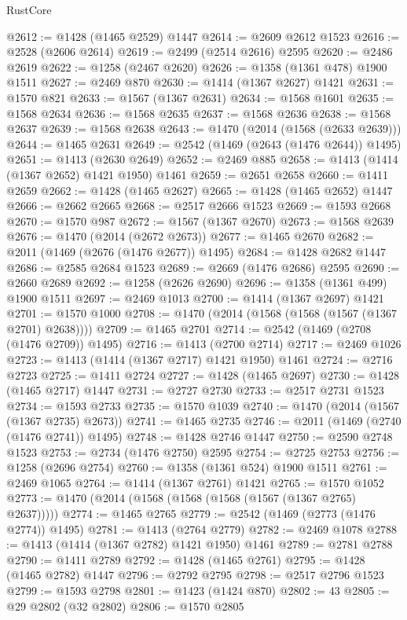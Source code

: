 \begin{lexlean}{RustCore}
\begin{coremodule}
@2612 := @1428 (@1465 @2529) @1447
@2614 := @2609 @2612 @1523
@2616 := @2528 (@2606 @2614)
@2619 := @2499 (@2514 @2616) @2595
@2620 := @2486 @2619
@2622 := @1258 (@2467 @2620)
@2626 := @1358 (@1361 @478) @1900 @1511
@2627 := @2469 @870
@2630 := @1414 (@1367 @2627) @1421
@2631 := @1570 @821
@2633 := @1567 (@1367 @2631)
@2634 := @1568 @1601
@2635 := @1568 @2634
@2636 := @1568 @2635
@2637 := @1568 @2636
@2638 := @1568 @2637
@2639 := @1568 @2638
@2643 := @1470 (@2014 (@1568 (@2633 @2639)))
@2644 := @1465 @2631
@2649 := @2542 (@1469 (@2643 (@1476 @2644)) @1495)
@2651 := @1413 (@2630 @2649)
@2652 := @2469 @885
@2658 := @1413 (@1414 (@1367 @2652) @1421 @1950) @1461
@2659 := @2651 @2658
@2660 := @1411 @2659
@2662 := @1428 (@1465 @2627)
@2665 := @1428 (@1465 @2652) @1447
@2666 := @2662 @2665
@2668 := @2517 @2666 @1523
@2669 := @1593 @2668
@2670 := @1570 @987
@2672 := @1567 (@1367 @2670)
@2673 := @1568 @2639
@2676 := @1470 (@2014 (@2672 @2673))
@2677 := @1465 @2670
@2682 := @2011 (@1469 (@2676 (@1476 @2677)) @1495)
@2684 := @1428 @2682 @1447
@2686 := @2585 @2684 @1523
@2689 := @2669 (@1476 @2686) @2595
@2690 := @2660 @2689
@2692 := @1258 (@2626 @2690)
@2696 := @1358 (@1361 @499) @1900 @1511
@2697 := @2469 @1013
@2700 := @1414 (@1367 @2697) @1421
@2701 := @1570 @1000
@2708 := @1470 (@2014 (@1568 (@1568 (@1567 (@1367 @2701) @2638))))
@2709 := @1465 @2701
@2714 := @2542 (@1469 (@2708 (@1476 @2709)) @1495)
@2716 := @1413 (@2700 @2714)
@2717 := @2469 @1026
@2723 := @1413 (@1414 (@1367 @2717) @1421 @1950) @1461
@2724 := @2716 @2723
@2725 := @1411 @2724
@2727 := @1428 (@1465 @2697)
@2730 := @1428 (@1465 @2717) @1447
@2731 := @2727 @2730
@2733 := @2517 @2731 @1523
@2734 := @1593 @2733
@2735 := @1570 @1039
@2740 := @1470 (@2014 (@1567 (@1367 @2735) @2673))
@2741 := @1465 @2735
@2746 := @2011 (@1469 (@2740 (@1476 @2741)) @1495)
@2748 := @1428 @2746 @1447
@2750 := @2590 @2748 @1523
@2753 := @2734 (@1476 @2750) @2595
@2754 := @2725 @2753
@2756 := @1258 (@2696 @2754)
@2760 := @1358 (@1361 @524) @1900 @1511
@2761 := @2469 @1065
@2764 := @1414 (@1367 @2761) @1421
@2765 := @1570 @1052
@2773 := @1470 (@2014 (@1568 (@1568 (@1568 (@1567 (@1367 @2765) @2637)))))
@2774 := @1465 @2765
@2779 := @2542 (@1469 (@2773 (@1476 @2774)) @1495)
@2781 := @1413 (@2764 @2779)
@2782 := @2469 @1078
@2788 := @1413 (@1414 (@1367 @2782) @1421 @1950) @1461
@2789 := @2781 @2788
@2790 := @1411 @2789
@2792 := @1428 (@1465 @2761)
@2795 := @1428 (@1465 @2782) @1447
@2796 := @2792 @2795
@2798 := @2517 @2796 @1523
@2799 := @1593 @2798
@2801 := @1423 (@1424 @870)
@2802 := 43
@2805 := @29 @2802 (@32 @2802)
@2806 := @1570 @2805

\end{coremodule}
\end{lexlean}
